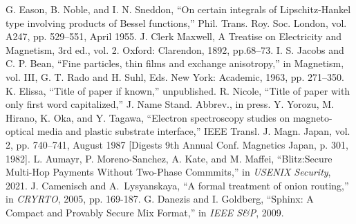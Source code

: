 \documentclass[conference]{IEEEtran}
\begin{document}
\begin{thebibliography}{99}
 G. Eason, B. Noble, and I. N. Sneddon, ``On certain integrals of Lipschitz-Hankel type involving products of Bessel functions,'' Phil. Trans. Roy. Soc. London, vol. A247, pp. 529--551, April 1955.
 J. Clerk Maxwell, A Treatise on Electricity and Magnetism, 3rd ed., vol. 2. Oxford: Clarendon, 1892, pp.68--73.
 I. S. Jacobs and C. P. Bean, ``Fine particles, thin films and exchange anisotropy,'' in Magnetism, vol. III, G. T. Rado and H. Suhl, Eds. New York: Academic, 1963, pp. 271--350.
 K. Elissa, ``Title of paper if known,'' unpublished.
 R. Nicole, ``Title of paper with only first word capitalized,'' J. Name Stand. Abbrev., in press.
 Y. Yorozu, M. Hirano, K. Oka, and Y. Tagawa, ``Electron spectroscopy studies on magneto-optical media and plastic substrate interface,'' IEEE Transl. J. Magn. Japan, vol. 2, pp. 740--741, August 1987 [Digests 9th Annual Conf. Magnetics Japan, p. 301, 1982].
 L. Aumayr, P. Moreno-Sanchez, A. Kate, and M. Maffei, ``Blitz:Secure Multi-Hop Payments Without Two-Phase Commmits,'' in \textit{USENIX Security}, 2021.
 J. Camenisch and A.~Lysyanskaya, ``A formal treatment of onion routing,'' in \textit{CRYRTO}, 2005, pp. 169-187. 
 G. Danezis and I. Goldberg, ``Sphinx: A Compact and Provably Secure Mix Format,'' in \textit{IEEE S\&P}, 2009. 
\end{thebibliography}
\end{document}
